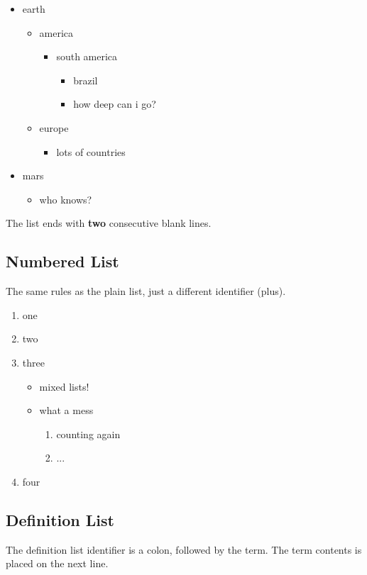 \documentclass{article}
\begin{document}
\begin{itemize}
\item earth
  \begin{itemize}
  \item america
    \begin{itemize}
    \item south america
      \begin{itemize}
      \item brazil
      \item how deep can i go?
      \end{itemize}
    \end{itemize}
  \item europe
    \begin{itemize}
    \item lots of countries
    \end{itemize}
  \end{itemize}
\item mars
  \begin{itemize}
  \item who knows?
  \end{itemize}
\end{itemize}

The list ends with \textbf{two} consecutive blank lines.

\subsection*{Numbered List}
The same rules as the plain list, just a different
identifier (plus).

\begin{enumerate}
\item one
\item two
\item three
  \begin{itemize}
  \item mixed lists!
  \item what a mess
    \begin{enumerate}
    \item counting again
    \item ...
    \end{enumerate}
  \end{itemize}
\item four
\end{enumerate}

\subsection*{Definition List}
The definition list identifier is a colon, followed by
the term. The term contents is placed on the next line.
\end{document}
